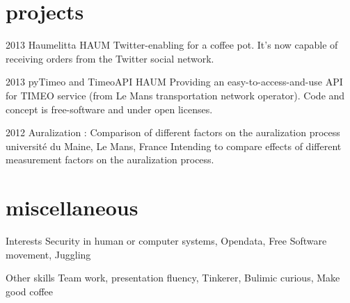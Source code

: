 \documentclass[]{friggeri-cv} %
\begin{document}

\section{projects}

\begin{entrylist}
\entry
{2013}
{Haumelitta}
{HAUM}
{Twitter-enabling for a coffee pot. It's now capable of receiving orders from the Twitter social network.}

\entry
{2013}
{pyTimeo and TimeoAPI}
{HAUM}
{Providing an easy-to-access-and-use API for TIMEO service (from Le Mans transportation network operator).
Code and concept is free-software and under open licenses.}

\entry
{2012}
{Auralization : Comparison of different factors on the auralization process}
{université du Maine, Le Mans, France}
{Intending to compare effects of different measurement factors on the auralization process.}
\end{entrylist}


\section{miscellaneous}

\begin{entrylist}
\entry
{Interests}{}{}
{Security in human or computer systems, Opendata, Free Software movement, Juggling}

\entry
{Other skills}{}{}
{Team work, presentation fluency, Tinkerer, Bulimic curious, Make good coffee}

\end{entrylist}
\end{document}
